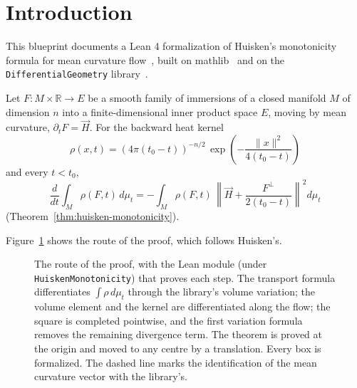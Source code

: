 \begin{abstract}
We formalize in Lean 4 Huisken's monotonicity formula for mean curvature
flow~\cite{huisken1990}: for a closed manifold moving by mean curvature, the integral of the
backward heat kernel over the evolving surface is non-increasing in time. The proof follows
Huisken's, in any codimension, for an arbitrary centre and without a unit normal, and is built on
mathlib~\cite{mathlib2020} and the \texttt{DifferentialGeometry} library~\cite{differentialgeometry}.
The code is available at \url{https://github.com/kashif/huisken-monotonicity}.
\end{abstract}

\section{Introduction}

This blueprint documents a Lean 4 formalization of Huisken's monotonicity formula for
mean curvature flow~\cite{huisken1990}, built on mathlib~\cite{mathlib2020} and on the
\texttt{DifferentialGeometry} library~\cite{differentialgeometry}.

Let $F \colon M \times \mathbb{R} \to E$ be a smooth family of immersions of a closed
manifold $M$ of dimension $n$ into a finite-dimensional inner product space $E$, moving
by mean curvature, $\partial_t F = \vec H$. For the backward heat kernel
\[
  \rho(x, t) = (4\pi(t_0 - t))^{-n/2}\,\exp\!\left(-\frac{\|x\|^2}{4(t_0 - t)}\right)
\]
and every $t < t_0$,
\[
  \frac{d}{dt}\int_M \rho(F, t)\,d\mu_t = -\int_M \rho(F, t)\,
    \left\| \vec H + \frac{F^\perp}{2(t_0 - t)} \right\|^2 d\mu_t
\]
(Theorem~\ref{thm:huisken-monotonicity}).

Figure~\ref{fig:proof-route} shows the route of the proof, which follows Huisken's.

\begin{figure}[htbp]
\centering

\caption{The route of the proof, with the Lean module (under \texttt{HuiskenMonotonicity})
that proves each step. The transport formula differentiates $\int \rho\,d\mu_t$ through the
library's volume variation; the volume element and the kernel are differentiated along the
flow; the square is completed pointwise, and the first variation formula removes the
remaining divergence term. The theorem is proved at the origin and moved to any centre by a
translation. Every box is formalized. The dashed line marks the identification of the mean
curvature vector with the library's.}
\label{fig:proof-route}
\end{figure}

